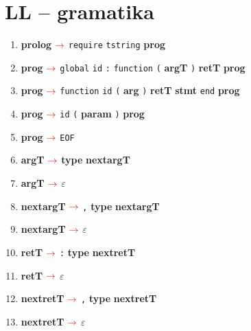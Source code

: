 \documentclass[a4paper, 11pt]{article}
\def\nonterm #1{\boldmath{$<$}\textbf{#1}\boldmath{$>$}\space}
\def\term #1{\texttt{#1}\space}
\newcommand{\arrow} {$\color{red} \rightarrow$\space}
\newcommand{\unsc} {\underline{\hspace{0.2cm}}}
\begin{document}
    \section*{LL -- gramatika}
    \label{sec: LL-gramatika}
    \begin{enumerate}[label=\textcolor{red}{\arabic*.}]
        \item \nonterm{prolog} \arrow{} \term{require} \term{t\unsc{}string} \nonterm{prog}

        \item \nonterm{prog} \arrow{} \term{global} \term{id} \term{:} \term{function} \term{(} \nonterm{arg\unsc{}T} \term{)} \nonterm{ret\unsc{}T} \nonterm{prog}

        \item \nonterm{prog} \arrow{} \term{function} \term{id} \term{(} \nonterm{arg} \term{)} \nonterm{ret\unsc{}T} \nonterm{stmt} \term{end} \nonterm{prog}

        \item \nonterm{prog} \arrow{} \term{id} \term{(} \nonterm{param} \term{)} \nonterm{prog}
        \item \nonterm{prog} \arrow{} \term{EOF}

        \item \nonterm{arg\unsc{}T} \arrow{} \nonterm{type} \nonterm{next\unsc{}arg\unsc{}T}
        \item \nonterm{arg\unsc{}T} \arrow{} \term{$\varepsilon$}

        \item \nonterm{next\unsc{}arg\unsc{}T} \arrow{} \term{,} \nonterm{type} \nonterm{next\unsc{}arg\unsc{}T}

        \item \nonterm{next\unsc{}arg\unsc{}T} \arrow{} \term{$\varepsilon$}

        \item \nonterm{ret\unsc{}T} \arrow{} \term{:} \nonterm{type} \nonterm{next\unsc{}ret\unsc{}T}

        \item \nonterm{ret\unsc{}T} \arrow{} \term{$\varepsilon$}

        \item \nonterm{next\unsc{}ret\unsc{}T} \arrow{} \term{,} \nonterm{type} \nonterm{next\unsc{}ret\unsc{}T}

        \item \nonterm{next\unsc{}ret\unsc{}T} \arrow{} \term{$\varepsilon$}


\end{enumerate}
\end{document}
